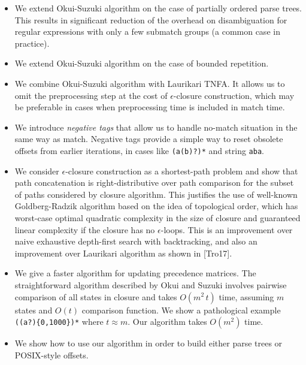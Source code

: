 \documentclass[AMA,STIX1COL]{WileyNJD-v2}
\begin{document}
\begin{itemize}[itemsep=0.5em]

    \item We extend Okui-Suzuki algorithm on the case of partially ordered parse trees.
        This results in significant reduction of the overhead on disambiguation
        for regular expressions with only a few submatch groups (a common case in practice).

    \item We extend Okui-Suzuki algorithm on the case of bounded repetition.

    \item We combine Okui-Suzuki algorithm with Laurikari TNFA.
        It allows us to omit the preprocessing step
        at the cost of $\epsilon$-closure construction,
        which may be preferable in cases when preprocessing time is included in match time.

    \item We introduce \emph{negative tags} that allow us to handle
        no-match situation in the same way as match.
        Negative tags provide a simple way to reset obsolete offsets from earlier iterations,
        in cases like \texttt{(a(b)?)*} and string \texttt{aba}.

    \item We consider $\epsilon$-closure construction as a shortest-path problem
        and show that path concatenation is right-distributive over path comparison
        for the subset of paths considered by closure algorithm.
        This justifies the use of well-known Goldberg-Radzik algorithm based on the idea of topological order,
        which has worst-case optimal quadratic complexity in the size of closure
        and guaranteed linear complexity if the closure has no $\epsilon$-loops.
        This is an improvement over naive exhaustive depth-first search with backtracking,
        and also an improvement over Laurikari algorithm as shown in [Tro17].

    \item We give a faster algorithm for updating precedence matrices.
        The straightforward algorithm described by Okui and Suzuki involves pairwise comparison of all states in closure
        and takes $O(m^2 \, t)$ time, assuming $m$ states and $O(t)$ comparison function.
        We show a pathological example \texttt{((a?)\{0,1000\})*} where $t \approx m$.
        Our algorithm takes $O(m^2)$ time.

    \item We show how to use our algorithm in order to build either parse trees or POSIX-style offsets.


\end{itemize}
\end{document}
